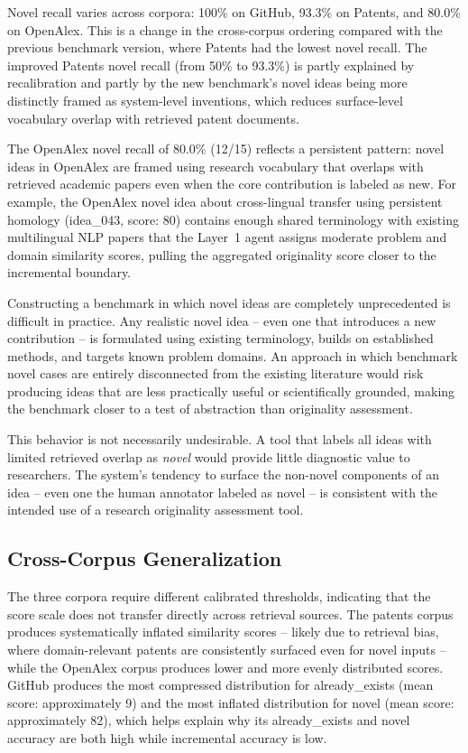 Novel recall varies across corpora: 100\% on GitHub, 93.3\% on Patents, and 80.0\% on OpenAlex. This is a change in the cross-corpus ordering compared with the previous benchmark version, where Patents had the lowest novel recall. The improved Patents novel recall (from 50\% to 93.3\%) is partly explained by recalibration and partly by the new benchmark's novel ideas being more distinctly framed as system-level inventions, which reduces surface-level vocabulary overlap with retrieved patent documents.
 
The OpenAlex novel recall of 80.0\% (12/15) reflects a persistent pattern: novel ideas in OpenAlex are framed using research vocabulary that overlaps with retrieved academic papers even when the core contribution is labeled as new. For example, the OpenAlex novel idea about cross-lingual transfer using persistent homology (idea\_043, score: 80) contains enough shared terminology with existing multilingual NLP papers that the Layer~1 agent assigns moderate problem and domain similarity scores, pulling the aggregated originality score closer to the incremental boundary.
 
Constructing a benchmark in which novel ideas are completely unprecedented is difficult in practice. Any realistic novel idea -- even one that introduces a new contribution -- is formulated using existing terminology, builds on established methods, and targets known problem domains. An approach in which benchmark novel cases are entirely disconnected from the existing literature would risk producing ideas that are less practically useful or scientifically grounded, making the benchmark closer to a test of abstraction than originality assessment.
 
This behavior is not necessarily undesirable. A tool that labels all ideas with limited retrieved overlap as \textit{novel} would provide little diagnostic value to researchers. The system's tendency to surface the non-novel components of an idea -- even one the human annotator labeled as novel -- is consistent with the intended use of a research originality assessment tool.
 
\subsection{Cross-Corpus Generalization}
\label{sec:crosscorpus}
 
The three corpora require different calibrated thresholds, indicating that the score scale does not transfer directly across retrieval sources. The patents corpus produces systematically inflated similarity scores -- likely due to retrieval bias, where domain-relevant patents are consistently surfaced even for novel inputs -- while the OpenAlex corpus produces lower and more evenly distributed scores. GitHub produces the most compressed distribution for already\_exists (mean score: approximately 9) and the most inflated distribution for novel (mean score: approximately 82), which helps explain why its already\_exists and novel accuracy are both high while incremental accuracy is low.
 
